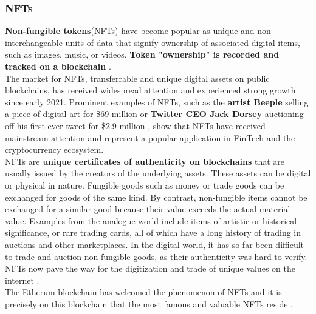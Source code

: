 \subsubsection{NFTs}
\textbf{Non-fungible tokens}(NFTs) have become popular as unique and non-interchangeable units of data that signify ownership of associated digital items, such as images, music, or videos. \textbf{Token "ownership" is recorded and tracked on a blockchain} \cite{ETH_NFT}\cite{CRS_NFT}. 
\\
\indent The market for NFTs, transferrable and unique digital assets on public blockchains, has received widespread attention and experienced strong growth since early 2021. Prominent examples of NFTs, such as the \textbf{artist Beeple} selling a piece of digital art for \$69 million \cite{Beeple} or \textbf{Twitter CEO Jack Dorsey} auctioning off his first-ever tweet for \$2.9 million \cite{Twttr}, show that NFTs have received mainstream attention and represent a popular application in FinTech and the cryptocurrency ecosystem. 
\\
\indent NFTs are \textbf{unique certificates of authenticity on blockchains} that are usually issued by the creators of the underlying assets. These assets can be digital or physical in nature. Fungible goods such as money or trade goods can be exchanged for goods of the same kind. By contrast, non-fungible items cannot be exchanged for a similar good because their value exceeds the actual material value. Examples from the analogue world include items of artistic or historical significance, or rare trading cards, all of which have a long history of trading in auctions and other marketplaces. In the digital world, it has so far been difficult to trade and auction non-fungible goods, as their authenticity was hard to verify. NFTs now pave the way for the digitization and trade of unique values on the internet \cite{ante2022non}.
\\
\indent The Etherum blockchain has welcomed the phenomenon of NFTs and it is precisely on this blockchain that the most famous and valuable NFTs reside \cite{NFT}. 

